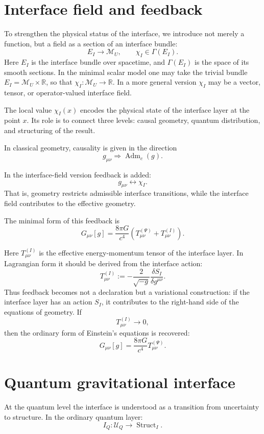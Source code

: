 \documentclass[12pt,a4paper]{article}
\DeclareMathOperator{\Adm}{Adm}
\DeclareMathOperator{\Struct}{Struct}
\newcommand{\M}{\mathcal M_U}
\newcommand{\Unc}{\mathcal U}
\begin{document}
\section{Interface field and feedback}

To strengthen the physical status of the interface, we introduce not merely a function, but a field as a section of an interface bundle:
\[
\boxed{
E_I\longrightarrow \M,
\qquad
\chi_I\in\Gamma(E_I).
}
\]
Here $E_I$ is the interface bundle over spacetime, and $\Gamma(E_I)$ is the space of its smooth sections. In the minimal scalar model one may take the trivial bundle $E_I=\M\times\mathbb R$, so that $\chi_I:\M\to\mathbb R$. In a more general version $\chi_I$ may be a vector, tensor, or operator-valued interface field.

The local value $\chi_I(x)$ encodes the physical state of the interface layer at the point $x$. Its role is to connect three levels: causal geometry, quantum distribution, and structuring of the result.

In classical geometry, causality is given in the direction
\[
g_{\mu\nu}\Rightarrow \Adm_c(g).
\]

In the interface-field version feedback is added:
\[
\boxed{
g_{\mu\nu}\leftrightarrow\chi_I.
}
\]
That is, geometry restricts admissible interface transitions, while the interface field contributes to the effective geometry.

The minimal form of this feedback is
\[
\boxed{
G_{\mu\nu}[g]
=
\frac{8\pi G}{c^4}
\left(
T_{\mu\nu}^{(\Psi)}+T_{\mu\nu}^{(I)}
\right).
}
\]

Here $T_{\mu\nu}^{(I)}$ is the effective energy-momentum tensor of the interface layer. In Lagrangian form it should be derived from the interface action:
\[
\boxed{
T_{\mu\nu}^{(I)}
:=
-\frac{2}{\sqrt{-g}}
\frac{\delta S_I}{\delta g^{\mu\nu}}.
}
\]
Thus feedback becomes not a declaration but a variational construction: if the interface layer has an action $S_I$, it contributes to the right-hand side of the equations of geometry. If
\[
T_{\mu\nu}^{(I)}\to 0,
\]
then the ordinary form of Einstein's equations is recovered:
\[
G_{\mu\nu}[g]
=
\frac{8\pi G}{c^4}T_{\mu\nu}^{(\Psi)}.
\]

\section{Quantum gravitational interface}

At the quantum level the interface is understood as a transition from uncertainty to structure. In the ordinary quantum layer:
\[
I_Q:\Unc_Q\to\Struct_I.
\]
\end{document}
